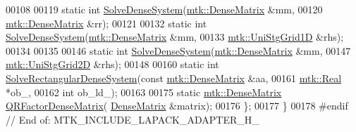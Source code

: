 \begin{DoxyCode}
00108 
00119   \textcolor{keyword}{static} \textcolor{keywordtype}{int} \hyperlink{classmtk_1_1LAPACKAdapter_a7428bccf74fd4a4af68fb7233846da22}{SolveDenseSystem}(\hyperlink{classmtk_1_1DenseMatrix}{mtk::DenseMatrix} &mm,
00120                               \hyperlink{classmtk_1_1DenseMatrix}{mtk::DenseMatrix} &rr);
00121 
00132   \textcolor{keyword}{static} \textcolor{keywordtype}{int} \hyperlink{classmtk_1_1LAPACKAdapter_a7428bccf74fd4a4af68fb7233846da22}{SolveDenseSystem}(\hyperlink{classmtk_1_1DenseMatrix}{mtk::DenseMatrix} &mm,
00133                               \hyperlink{classmtk_1_1UniStgGrid1D}{mtk::UniStgGrid1D} &rhs);
00134 
00135 
00146   \textcolor{keyword}{static} \textcolor{keywordtype}{int} \hyperlink{classmtk_1_1LAPACKAdapter_a7428bccf74fd4a4af68fb7233846da22}{SolveDenseSystem}(\hyperlink{classmtk_1_1DenseMatrix}{mtk::DenseMatrix} &mm,
00147                               \hyperlink{classmtk_1_1UniStgGrid2D}{mtk::UniStgGrid2D} &rhs);
00148 
00160   \textcolor{keyword}{static} \textcolor{keywordtype}{int} \hyperlink{classmtk_1_1LAPACKAdapter_a380f148ffdf96bae2f79ae28f1a6560c}{SolveRectangularDenseSystem}(\textcolor{keyword}{const} 
      \hyperlink{classmtk_1_1DenseMatrix}{mtk::DenseMatrix} &aa,
00161                                          \hyperlink{group__c01-roots_gac080bbbf5cbb5502c9f00405f894857d}{mtk::Real} *ob\_,
00162                                          \textcolor{keywordtype}{int} ob\_ld\_);
00163 
00175   \textcolor{keyword}{static} \hyperlink{classmtk_1_1DenseMatrix}{mtk::DenseMatrix} \hyperlink{classmtk_1_1LAPACKAdapter_ae5c6e78c9c819c9ac7a6f31bfd011d7a}{QRFactorDenseMatrix}(
      \hyperlink{classmtk_1_1DenseMatrix}{DenseMatrix} &matrix);
00176 \};
00177 \}
00178 \textcolor{preprocessor}{#endif  // End of: MTK\_INCLUDE\_LAPACK\_ADAPTER\_H\_}
\end{DoxyCode}
